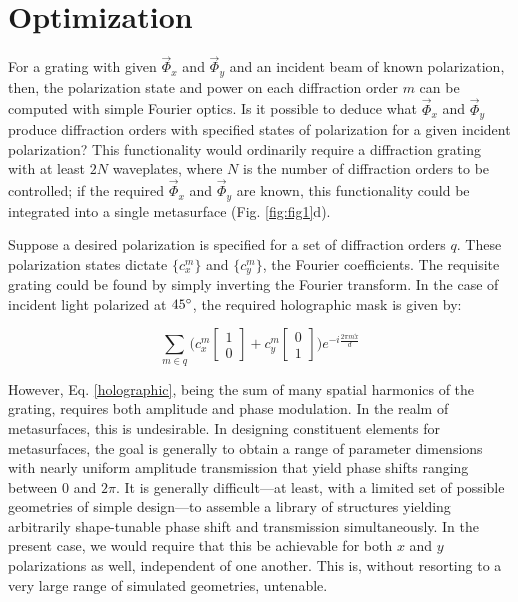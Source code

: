 \documentclass[footinbib,aps,prl,twocolumn,superscriptaddress]{revtex4-1}
\begin{document}
\section{Optimization}

For a grating with given $\vec{\Phi}_x$ and $\vec{\Phi}_y$ and an incident beam of known polarization, then, the polarization state and power on each diffraction order $m$ can be computed with simple Fourier optics. Is it possible to deduce what $\vec{\Phi}_x$ and $\vec{\Phi}_y$ produce diffraction orders with specified states of polarization for a given incident polarization? This functionality would ordinarily require a diffraction grating with at least $2N$ waveplates, where $N$ is the number of diffraction orders to be controlled; if the required $\vec{\Phi}_x$ and $\vec{\Phi}_y$ are known, this functionality could be integrated into a single metasurface (Fig. \ref{fig:fig1}d).

Suppose a desired polarization is specified for a set of diffraction orders $q$. These polarization states dictate $\{c_x^m\}$ and $\{c_y^m\}$, the Fourier coefficients. The requisite grating could be found by simply inverting the Fourier transform. In the case of incident light polarized at $45\degree$, the required holographic mask is given by:

\begin{equation}
\label{holographic}
	\sum_{m \in q} \Big(c_x^m \begin{bmatrix}
	1 \\ 0
	\end{bmatrix} + c_y^m \begin{bmatrix}
	0 \\ 1
	\end{bmatrix}\Big) e^{-i \frac{2\pi m \tilde{x}}{d}}
\end{equation}

However, Eq. \ref{holographic}, being the sum of many spatial harmonics of the grating, requires both amplitude and phase modulation. In the realm of metasurfaces, this is undesirable. In designing constituent elements for metasurfaces, the goal is generally to obtain a range of parameter dimensions with nearly uniform amplitude transmission that yield phase shifts ranging between $0$ and $2\pi$. It is generally difficult---at least, with a limited set of possible geometries of simple design---to assemble a library of structures yielding arbitrarily shape-tunable phase shift and transmission simultaneously. In the present case, we would require that this be achievable for both $x$ and $y$ polarizations as well, independent of one another. This is, without resorting to a very large range of simulated geometries, untenable.
\end{document}
